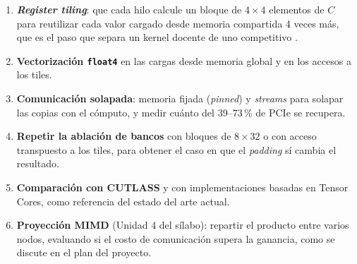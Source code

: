 	\begin{enumerate}
		\item \textbf{\textit{Register tiling}}: que cada hilo calcule un bloque de $4 \times 4$ elementos de $C$ para reutilizar cada valor cargado desde memoria compartida 4 veces más, que es el paso que separa un kernel docente de uno competitivo \cite{kirkhwu}.
		\item \textbf{Vectorización \texttt{float4}} en las cargas desde memoria global y en los accesos a los tiles.
		\item \textbf{Comunicación solapada}: memoria fijada (\textit{pinned}) y \textit{streams} para solapar las copias con el cómputo, y medir cuánto del 39--73\,\% de PCIe se recupera.
		\item \textbf{Repetir la ablación de bancos} con bloques de $8 \times 32$ o con acceso transpuesto a los tiles, para obtener el caso en que el \textit{padding} sí cambia el resultado.
		\item \textbf{Comparación con CUTLASS} y con implementaciones basadas en Tensor Cores, como referencia del estado del arte actual.
		\item \textbf{Proyección MIMD} (Unidad 4 del sílabo): repartir el producto entre varios nodos, evaluando si el costo de comunicación supera la ganancia, como se discute en el plan del proyecto.
	\end{enumerate}
